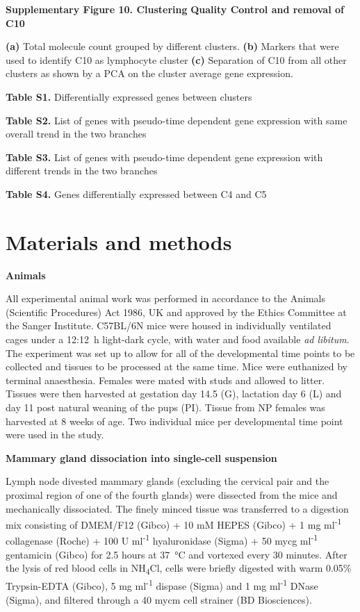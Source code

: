 \documentclass[titlepage, 12pt, oneside]{amsart}
\begin{document}
\textbf{Supplementary Figure 10. Clustering} \textbf{Quality Control and
removal of C10}

\textbf{(a)} Total molecule count grouped by different clusters.
\textbf{(b)} Markers that were used to identify C10 as lymphocyte cluster\autocite{Scheele2017} \textbf{(c)} Separation of C10 from all other clusters as shown by a PCA on the cluster average gene expression.

\textbf{Table S1.} Differentially expressed genes between clusters

\textbf{Table S2.} List of genes with pseudo-time dependent gene
expression with same overall trend in the two branches

\textbf{Table S3.} List of genes with pseudo-time dependent gene
expression with different trends in the two branches

\textbf{Table S4.} Genes differentially expressed between C4 and C5

\section{Materials and methods}

\textbf{Animals}

All experimental animal work was performed in accordance to the Animals (Scientific Procedures) Act 1986, UK and approved by the Ethics Committee at the Sanger Institute.
C57BL/6N mice were housed in individually ventilated cages under a 12:12~h light-dark cycle, with water and food available \textit{ad libitum}.
The experiment was set up to allow for all of the developmental time points to be collected and tissues to be processed at the same time.
Mice were euthanized by terminal anaesthesia.
Females were mated with studs and allowed to litter.
Tissues were then harvested at gestation day 14.5 (G), lactation day 6 (L) and day 11 post natural weaning of the pups (PI).
Tissue from NP females was harvested at 8 weeks of age.
Two individual mice per developmental time point were used in the study.

\textbf{Mammary gland dissociation into single-cell suspension}

Lymph node divested mammary glands (excluding the cervical pair and the proximal region of one of the fourth glands) were dissected from the mice and mechanically dissociated.
The finely minced tissue was transferred to a digestion mix consisting of DMEM/F12 (Gibco) + 10 mM HEPES (Gibco) + 1 mg ml\textsuperscript{-1} collagenase (Roche) + 100 U ml\textsuperscript{-1} hyaluronidase (Sigma) + 50 mycg ml\textsuperscript{-1} gentamicin (Gibco) for 2.5 hours at \SI{37}{\celsius} and vortexed every 30 minutes.
After the lysis of red blood cells in NH\textsubscript{4}Cl, cells were briefly digested with warm 0.05\% Trypsin-EDTA (Gibco), 5 mg ml\textsuperscript{-1} dispase (Sigma) and 1 mg ml\textsuperscript{-1} DNase (Sigma), and filtered through a 40 mycm cell strainer (BD Biosciences).
\end{document}
